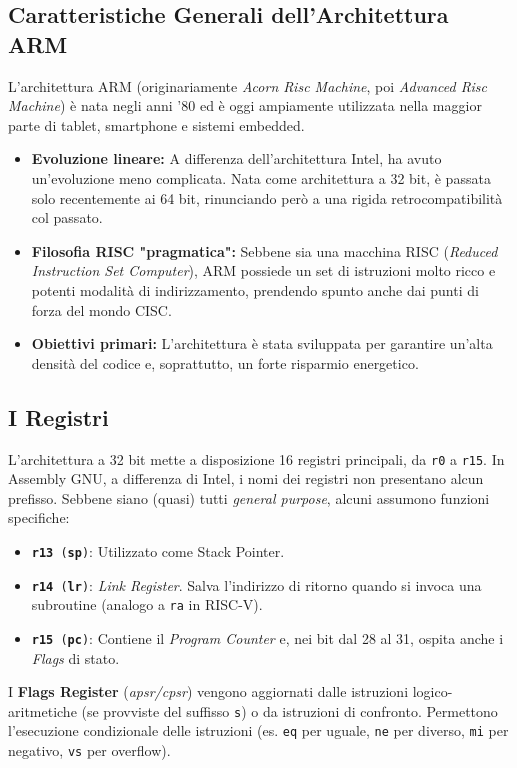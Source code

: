 \documentclass[12pt, a4paper]{article}
\begin{document}
\subsection{Caratteristiche Generali dell'Architettura ARM}
L'architettura ARM (originariamente \textit{Acorn Risc Machine}, poi \textit{Advanced Risc Machine}) è nata negli anni '80 ed è oggi ampiamente utilizzata nella maggior parte di tablet, smartphone e sistemi embedded. 
\begin{itemize}
    \item \textbf{Evoluzione lineare:} A differenza dell'architettura Intel, ha avuto un'evoluzione meno complicata. Nata come architettura a 32 bit, è passata solo recentemente ai 64 bit, rinunciando però a una rigida retrocompatibilità col passato.
    \item \textbf{Filosofia RISC "pragmatica":} Sebbene sia una macchina RISC (\textit{Reduced Instruction Set Computer}), ARM possiede un set di istruzioni molto ricco e potenti modalità di indirizzamento, prendendo spunto anche dai punti di forza del mondo CISC.
    \item \textbf{Obiettivi primari:} L'architettura è stata sviluppata per garantire un'alta densità del codice e, soprattutto, un forte risparmio energetico.
\end{itemize}

\subsection{I Registri}
L'architettura a 32 bit mette a disposizione 16 registri principali, da \texttt{r0} a \texttt{r15}. In Assembly GNU, a differenza di Intel, i nomi dei registri non presentano alcun prefisso.
Sebbene siano (quasi) tutti \textit{general purpose}, alcuni assumono funzioni specifiche:

\begin{itemize}
    \item \texttt{\textbf{r13} (\textbf{sp})}: Utilizzato come Stack Pointer.
    \item \texttt{\textbf{r14} (\textbf{lr})}: \textit{Link Register}. Salva l'indirizzo di ritorno quando si invoca una subroutine (analogo a \texttt{ra} in RISC-V).
    \item \texttt{\textbf{r15} (\textbf{pc})}: Contiene il \textit{Program Counter} e, nei bit dal 28 al 31, ospita anche i \textit{Flags} di stato.
\end{itemize}
I \textbf{Flags Register} (\textit{apsr/cpsr}) vengono aggiornati dalle istruzioni logico-aritmetiche (se provviste del suffisso \texttt{s}) o da istruzioni di confronto. Permettono l'esecuzione condizionale delle istruzioni (es. \texttt{eq} per uguale, \texttt{ne} per diverso, \texttt{mi} per negativo, \texttt{vs} per overflow).
\end{document}
